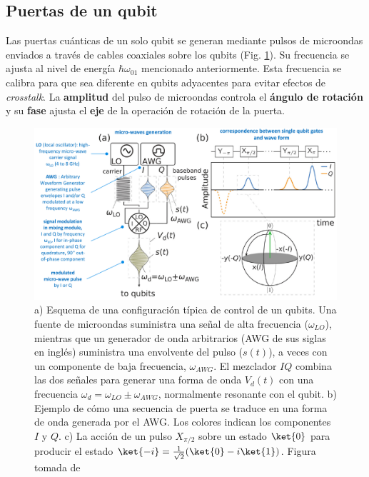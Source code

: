 \subsection{Puertas de un qubit}

Las puertas cuánticas de un solo qubit se generan mediante pulsos de microondas enviados a través de cables coaxiales sobre los qubits (Fig. \ref{Fig_scq_pulsos_1}). Su frecuencia se ajusta al nivel de energía $\hbar \omega_{01}$ mencionado anteriormente. Esta frecuencia se calibra para que sea diferente en qubits adyacentes para evitar efectos de \textit{crosstalk}. La \textbf{amplitud} del pulso de microondas controla el \textbf{ángulo de rotación} y su \textbf{fase} ajusta el \textbf{eje} de la operación de rotación de la puerta. 

	\begin{figure}[t]
	\centering 
	\includegraphics[width=1\linewidth]{Figuras/Fig_scq_pulsos_1.png}
	\caption{a) Esquema de una configuración típica de control de un qubits. Una fuente de microondas suministra una señal de alta frecuencia ($\omega_{LO}$), mientras que un generador de onda arbitrarios (AWG de sus siglas en inglés) suministra una envolvente del pulso ($s(t)$), a veces con un componente de baja frecuencia, $\omega_{AWG}$. El mezclador $IQ$ combina las dos señales para generar una forma de onda $V_d(t)$ con una frecuencia $\omega_d = \omega_{LO} \pm \omega_{AWG}$, normalmente resonante con el qubit. b) Ejemplo de cómo una secuencia de puerta se traduce en una forma de onda generada por el AWG. Los colores indican los componentes $I$ y $Q$. c) La acción de un pulso $X_{\pi/2}$ sobre un estado $\ket{0}$ para producir el estado $\ket{-i} = \frac{1}{\sqrt{2}} (\ket{0} - i\ket{1})$. Figura tomada de \cite{bib_scq_ezratty2023perspective}}
	\label{Fig_scq_pulsos_1}
	\end{figure}

